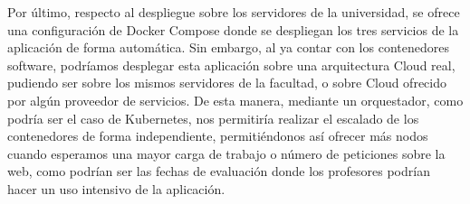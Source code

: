 Por último, respecto al despliegue sobre los servidores de la universidad,
se ofrece una configuración de Docker Compose donde se despliegan los tres
servicios de la aplicación de forma automática. Sin embargo, al ya contar
con los contenedores software, podríamos desplegar esta aplicación sobre
una arquitectura Cloud real, pudiendo ser sobre los mismos servidores de la
facultad, o sobre Cloud ofrecido por algún proveedor de servicios. De esta
manera, mediante un orquestador, como podría ser el caso de Kubernetes, nos
permitiría realizar el escalado de los contenedores de forma independiente,
permitiéndonos así ofrecer más nodos cuando esperamos una mayor carga de
trabajo o número de peticiones sobre la web, como podrían ser las fechas de
evaluación donde los profesores podrían hacer un uso intensivo de la
aplicación.


